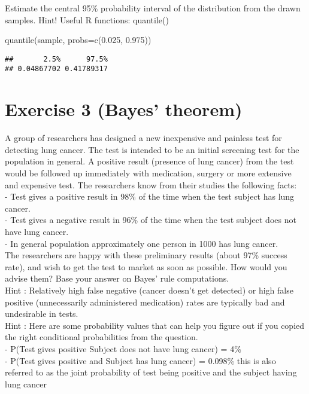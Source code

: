 \documentclass[
]{article}
\newenvironment{Shaded}{\begin{snugshade}}{\end{snugshade}}
\newcommand{\AttributeTok}[1]{\textcolor[rgb]{0.77,0.63,0.00}{#1}}
\newcommand{\FloatTok}[1]{\textcolor[rgb]{0.00,0.00,0.81}{#1}}
\newcommand{\FunctionTok}[1]{\textcolor[rgb]{0.00,0.00,0.00}{#1}}
\newcommand{\NormalTok}[1]{#1}
\begin{document}
Estimate the central 95\% probability interval of the distribution from
the drawn samples. Hint! Useful R functions: quantile()

\begin{Shaded}
\begin{Highlighting}[]
\FunctionTok{quantile}\NormalTok{(sample, }\AttributeTok{probs=}\FunctionTok{c}\NormalTok{(}\FloatTok{0.025}\NormalTok{, }\FloatTok{0.975}\NormalTok{))}
\end{Highlighting}
\end{Shaded}

\begin{verbatim}
##       2.5%      97.5% 
## 0.04867702 0.41789317
\end{verbatim}

\hypertarget{exercise-3-bayes-theorem}{%
\section{Exercise 3 (Bayes' theorem)}\label{exercise-3-bayes-theorem}}

A group of researchers has designed a new inexpensive and painless test
for detecting lung cancer. The test is intended to be an initial
screening test for the population in general. A positive result
(presence of lung cancer) from the test would be followed up immediately
with medication, surgery or more extensive and expensive test. The
researchers know from their studies the following facts:\\
- Test gives a positive result in 98\% of the time when the test subject
has lung cancer.\\
- Test gives a negative result in 96\% of the time when the test subject
does not have lung cancer.\\
- In general population approximately one person in 1000 has lung
cancer.\\
The researchers are happy with these preliminary results (about 97\%
success rate), and wish to get the test to market as soon as possible.
How would you advise them? Base your answer on Bayes' rule
computations.\\
Hint : Relatively high false negative (cancer doesn't get detected) or
high false positive (unnecessarily administered medication) rates are
typically bad and undesirable in tests.\\
Hint : Here are some probability values that can help you figure out if
you copied the right conditional probabilities from the question.\\
- P(Test gives positive \textbar{} Subject does not have lung cancer) =
4\%\\
- P(Test gives positive and Subject has lung cancer) = 0.098\% this is
also referred to as the joint probability of test being positive and the
subject having lung cancer\\
\end{document}
